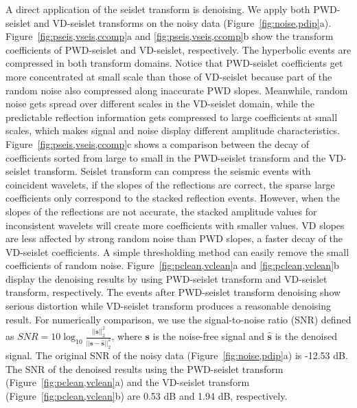 A direct application of the seislet transform is denoising. We apply
both PWD-seislet and VD-seislet transforms on the noisy data
(Figure~\ref{fig:noise,pdip}a). Figure~\ref{fig:pseis,vseis,ccomp}a and
\ref{fig:pseis,vseis,ccomp}b show the transform coefficients of PWD-seislet
and VD-seislet, respectively. The hyperbolic events are compressed in
both transform domains. Notice that PWD-seislet coefficients get more
concentrated at small scale than those of VD-seislet because part of
the random noise   also compressed along inaccurate PWD
slopes. Meanwhile, random noise gets spread over different scales in
the VD-seislet domain, while the predictable reflection information
gets compressed to large coefficients at small scales, which makes
signal and noise display different amplitude
characteristics. Figure~\ref{fig:pseis,vseis,ccomp}c shows a
comparison between the decay of coefficients sorted from large to
small in the PWD-seislet transform and the VD-seislet
transform. Seislet transform can compress the seismic events with
coincident wavelets, if the slopes of the reflections are correct, the
sparse large coefficients only correspond to the stacked reflection
events. However, when the slopes of the reflections are not accurate,
the stacked amplitude values for inconsistent wavelets will create
more coefficients with smaller values. VD slopes are less affected by
strong random noise than PWD slopes,   a faster decay of the VD-seislet
coefficients. A simple thresholding method can easily remove the small
coefficients of random noise. Figure~\ref{fig:pclean,vclean}a and
\ref{fig:pclean,vclean}b display the denoising results by using
PWD-seislet transform and VD-seislet transform, respectively. The
events after PWD-seislet transform denoising show serious distortion
while VD-seislet transform produces a reasonable denoising result. For
numerically comparison, we use the signal-to-noise ratio (SNR) defined
as $SNR=10\log_{10}\frac{||\mathbf{s}||_2^2}
{||\mathbf{s}-\hat{\mathbf{s}}||_2^2}$, where $\mathbf{s}$ is the
noise-free signal and $\hat{\mathbf{s}}$ is the denoised signal. The
original SNR of the noisy data (Figure~\ref{fig:noise,pdip}a) is
-12.53 dB. The SNR of the denoised results using the PWD-seislet
transform (Figure~\ref{fig:pclean,vclean}a) and the VD-seislet
transform (Figure~\ref{fig:pclean,vclean}b) are 0.53 dB and 1.94 dB,
respectively.


